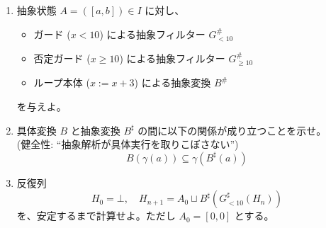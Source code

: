 \documentclass[
		head_space=20mm,
		foot_space=20mm,
		gutter=10mm,
		line_length=190mm
]{jlreq}
\begin{document}
\begin{practice}[抽象解釈]
\begin{enumerate}
		\item 抽象状態 $A=([a,b])\in I$ に対し、
		\begin{itemize}
			\item ガード ($x<10$) による抽象フィルター $G^\#_{<10}$ \item 否定ガード ($x\geq 10$) による抽象フィルター $G^\#_{\geq 10}$ \item ループ本体 ($x:=x+3$) による抽象変換 $B^\#$ 
		\end{itemize} 
		を与えよ。
		\item 具体変換 $B$ と抽象変換 $B^\sharp$ の間に以下の関係が成り立つことを示せ。\\ (健全性: ``抽象解析が具体実行を取りこぼさない'') \[B(\gamma(a))\subseteq\gamma(B^\sharp(a))\]
		\item 反復列 \[H_0=\bot,\quad H_{n+1}=A_0\sqcup B^\sharp(G^\sharp_{<10}(H_n))\] を、安定するまで計算せよ。ただし $A_0=[0,0]$ とする。%
	\end{enumerate}
\end{practice}
\end{document}
